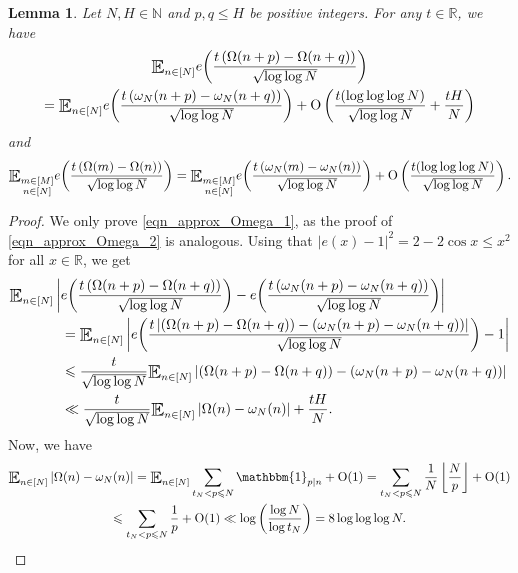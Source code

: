 \documentclass[letter,11pt]{article}
\theoremstyle{plain} %
\newtheorem{lemma}[theorem]{Lemma}
\theoremstyle{definition} %
\theoremstyle{plain}
\theoremstyle{plain}
\theoremstyle{plain}
\numberwithin{equation}{section}
\newcommand{\Oh}{{\mathrm O}}
\newcommand{\N}{\mathbb{N}}
\newcommand{\R}{\mathbb{R}}
\renewcommand{\leq}{\leqslant}
\newcommand{\Esub}[1]{\raisebox{-0.4ex}{\scalebox{1.4}[1.3]{$\mathbb{E}$}}\raisebox{-0.35ex}{\ensuremath{_{\scriptstyle #1}}}}
\newcommand{\1}{\mathbbm{1}}
\begin{document}
\begin{lemma}
\label{lem_approx_Omega}
Let $N,H\in\N$ and $p,q\leq H$ be positive integers.
For any $t\in\R$, we have
\begin{multline}
\label{eqn_approx_Omega_1}
\Esub{n\in[N]} e\bigg(\frac{t\left(\Omega(n+p)-\Omega(n+q)\right)}{\sqrt{\log\log{N}}} \bigg)
\\
=\Esub{n\in[N]}  e\bigg(  \frac{t\left(\omega_N(n+p)-\omega_N(n+q)\right)}{\sqrt{\log\log{N}}} \bigg)+\Oh\left(\frac{t(\log\log\log N)}{\sqrt{\log\log{N}}}+\frac{tH}{N}\right)
\end{multline}
and
\begin{equation}
\label{eqn_approx_Omega_2}
\Esub{\substack{m\in[M] \\ n\in[N]}} e\bigg(  \frac{t\left(\Omega(m)-\Omega(n)\right)}{\sqrt{\log\log{N}}} \bigg)=\Esub{\substack{m\in[M] \\ n\in[N]}}  e\bigg(  \frac{t\left(\omega_N(m)-\omega_N(n)\right)}{\sqrt{\log\log{N}}} \bigg)+\Oh\left(\frac{t(\log\log\log N)}{\sqrt{\log\log{N}}}\right).
\end{equation}
\end{lemma}

\begin{proof}
We only prove \eqref{eqn_approx_Omega_1}, as the proof of \eqref{eqn_approx_Omega_2} is analogous.
Using that $|e(x)-1|^2 = 2-2\cos{x} \leq x^2$ for all $x\in\R$, we get
\begin{align*}
&\Esub{n\in[N]} \left|e\bigg(  \frac{t\left(\Omega(n+p)-\Omega(n+q)\right)}{\sqrt{\log\log{N}}} \bigg)-e\bigg(  \frac{t\left(\omega_N(n+p)-\omega_N(n+q)\right)}{\sqrt{\log\log{N}}} \bigg)\right|
\\
&\hspace*{1.3cm} = \Esub{n\in[N]} \left|e\bigg( \frac{t \left|\left(\Omega(n+p)-\Omega(n+q)\right) - \left(\omega_N(n+p)-\omega_N(n+q)\right)\right|}{\sqrt{\log\log{N}}}\bigg)-1\right|
\\
&\hspace*{1.3cm} \leq \frac{t}{\sqrt{\log\log{N}}}
\Esub{n\in[N]}\left|\left(\Omega(n+p)-\Omega(n+q)\right) - \left(\omega_N(n+p)-\omega_N(n+q)\right)\right|
\\
&\hspace*{1.3cm}
\ll \frac{t}{\sqrt{\log\log{N}}}\Esub{n\in[N]}\left|\Omega(n)-\omega_N(n)\right| + \frac{tH}{N}.
\end{align*}
Now, we have
\begin{multline*}
\Esub{n\in[N]}\left|\Omega(n)-\omega_N(n)\right|
=\Esub{n\in[N]}\sum_{t_N< p \leq N}\1_{p\mid n}+\Oh(1)
=\sum_{t_N< p \leq N} \frac{1}{N}\left\lfloor \frac{N}{p}\right\rfloor+\Oh(1)
\\
\leq \sum_{t_N< p \leq N} \frac{1}{p} +\Oh(1)
\ll \log\bigg(\frac{\log{N}}{\log{t_N}}\bigg)
= 8\log\log\log{N}.
\end{multline*}
\end{proof}
\end{document}
